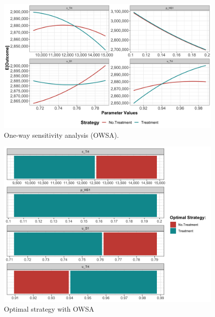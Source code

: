 \documentclass[]{book}
\begin{document}
\begin{figure}

{\centering \includegraphics[width=1\linewidth]{../figs/05b_owsa_lrm_nmb} 

}

\caption{One-way sensitivity analysis (OWSA).}\label{fig:05b-owsa-lrm-nmb}
\end{figure}

\begin{figure}

{\centering \includegraphics[width=1\linewidth]{../figs/05b_optimal_owsa_lrm_nmb} 

}

\caption{Optimal strategy with OWSA}\label{fig:05b-optimal-owsa-lrm-nmb}
\end{figure}
\end{document}
